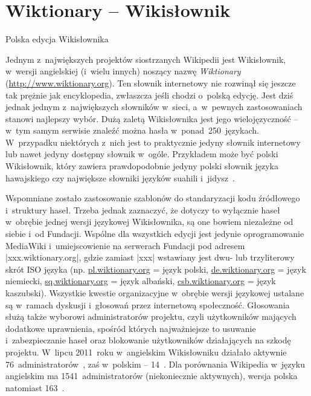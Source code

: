 \section{Wiktionary -- Wikisłownik}
\begin{illustration}
	\caption{Polska edycja Wikisłownika}
\end{illustration}
Jednym z~największych projektów siostrzanych Wikipedii jest Wikisłownik, w~wersji angielskiej (i~wielu innych) noszący nazwę \emph{Wiktionary} (\url{http://www.wiktionary.org}). Ten słownik internetowy nie rozwinął się jeszcze tak prężnie jak encyklopedia, zwłaszcza jeśli chodzi o~polską edycję. Jest dziś jednak jednym z~największych słowników w~sieci, a~w~pewnych zastosowaniach stanowi najlepszy wybór. Dużą zaletą Wikisłownika jest jego wielojęzyczność -- w~tym samym serwisie znaleźć można hasła w~ponad~250~językach. W~przypadku niektórych z~nich jest to praktycznie jedyny słownik internetowy lub nawet jedyny dostępny słownik w~ogóle. Przykładem może być polski Wikisłownik, który zawiera prawdopodobnie jedyny polski słownik języka hawajskiego czy największe słowniki języków suahili i~jidysz~\cite{wikt:dlaczego}.

Wspomniane zostało zastosowanie szablonów do standaryzacji kodu źródłowego i~struktury haseł. Trzeba jednak zaznaczyć, że dotyczy to wyłącznie haseł w~obrębie jednej wersji językowej Wikisłownika, są one bowiem niezależne od siebie i~od Fundacji. Wspólne dla wszystkich edycji jest jedynie oprogramowanie MediaWiki i~umiejscowienie na serwerach Fundacji pod adresem \kod|xxx.wiktionary.org|, gdzie zamiast \kod|xxx| wstawiany jest dwu- lub trzyliterowy skrót ISO języka (np. \url{pl.wiktionary.org} = język polski, \url{de.wiktionary.org} = język niemiecki, \url{sq.wiktionary.org} = język albański, \url{csb.wiktionary.org} = język kaszubski). Wszystkie kwestie organizacyjne w~obrębie wersji językowej ustalane są w~ramach dyskusji i~głosowań przez internetową społeczność. Głosowania służą także wyborowi administratorów projektu, czyli użytkowników mających dodatkowe uprawnienia, spośród których najważniejsze to usuwanie i~zabezpieczanie haseł oraz blokowanie użytkowników działających na szkodę projektu. W~lipcu 2011~roku w~angielskim Wikisłowniku działało aktywnie 76~administratorów~\cite{enwikt:admin}, zaś w~polskim -- 14~\cite{wikt:admin}. Dla porównania Wikipedia w~języku angielskim ma 1541~administratorów (niekoniecznie aktywnych), wersja polska natomiast 163~\cite{wiki:admin}.

